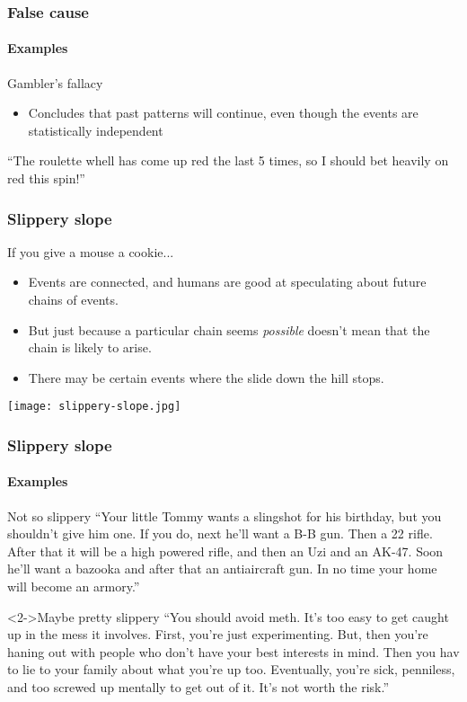 \documentclass[10pt,letterpaper,xcolor=dvipsnames,handout]{beamer}
\begin{document}
\begin{frame}
  \frametitle{False cause}
  \framesubtitle{Examples}
  
  \begin{block}{Gambler's fallacy}
    \begin{itemize}
      \item Concludes that past patterns will continue, even though the events are statistically independent
    \end{itemize}
    
    ``The roulette whell has come up red the last 5 times, so I should bet heavily on red this spin!''
  \end{block}
  
\end{frame}

\begin{frame}
  \frametitle{Slippery slope}
  
  \begin{block}{If you give a mouse a cookie...}
    \begin{itemize}
      \item Events are connected, and humans are good at speculating about future chains of events.
      \item But just because a particular chain seems \textit{possible} doesn't mean that the chain is likely to arise.
      \item There may be certain events where the slide down the hill stops.
    \end{itemize}
  \end{block}
  
    \begin{center}
    \texttt{[image: slippery-slope.jpg]}
  \end{center}
  
\end{frame}

\begin{frame}
  \frametitle{Slippery slope}
  \framesubtitle{Examples}
  
  \begin{block}{Not so slippery}
  ``Your little Tommy wants a slingshot for his birthday, but you shouldn’t give him one.  If you do, next he’ll want a B-B gun.  Then a 22 rifle.  After that it will be a high powered rifle, and then an Uzi and an AK-47.  Soon he’ll want a bazooka and after that an antiaircraft gun.  In no time your home will become an armory.''
  \end{block}
  
    \begin{block}<2->{Maybe pretty slippery}
    ``You should avoid meth.  It's too easy to get caught up in the mess it involves.  First, you're just experimenting.  But, then you're haning out with people who don't have your best interests in mind.  Then you hav to lie to your family about what you're up too.  Eventually, you're sick, penniless, and too screwed up mentally to get out of it.  It's not worth the risk.''
  \end{block}
  
\end{frame}
\end{document}
